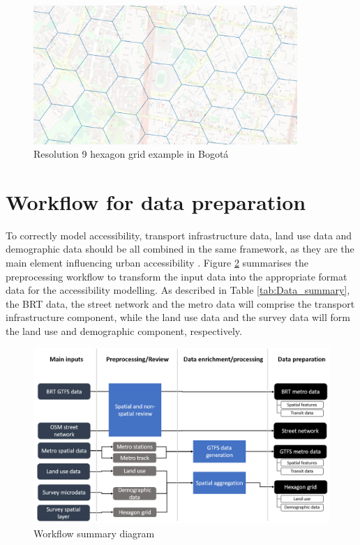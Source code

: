 \documentclass[12pt, a4paper]{report}
\begin{document}
\begin{figure}[H]
    \centering
    \includegraphics[width=10cm]{Images/Hex_grid.png}
    \caption{Resolution 9 hexagon grid example in Bogotá \citep{openstreetmapcontributorsPlanetDumpRetrieved2023a}}
    \label{fig:Hex_grid_example}
\end{figure}

\section{Workflow for data preparation}

To correctly model accessibility, transport infrastructure data, land use data and demographic data should be all combined in the same framework, as they are the main element influencing urban accessibility \citep{pereiraIntroductionUrbanAccessibility2023a}. Figure \ref{fig:Workflow_Summary} summarises the preprocessing workflow to transform the input data into the appropriate format data for the accessibility modelling. As described in Table \ref{tab:Data_summary}, the BRT data, the street network and the metro data will comprise the transport infrastructure component, while the land use data and the survey data will form the land use and demographic component, respectively.

\begin{figure}[H]
    \centering
    \includegraphics[width=13cm]{Images/Workflow_summary.png}
    \caption{Workflow summary diagram}
    \label{fig:Workflow_Summary}
\end{figure}
\end{document}
